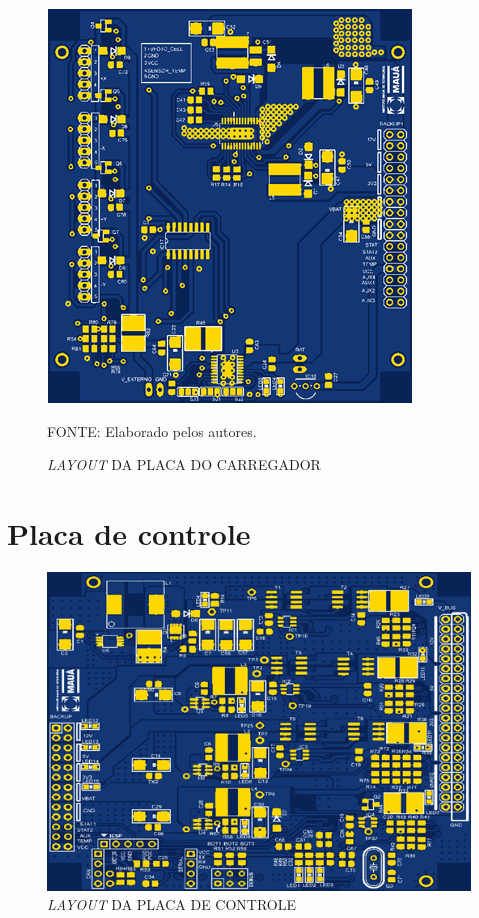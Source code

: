 \documentclass[
	12pt,				%
	openright,			%
	oneside,			%
	a4paper,			%
	english,			%
	french,				%
	spanish,			%
	brazil,				%
	oldfontcommands
	]{abntex2}
\begin{document}
\begin{apendicesenv}
	\begin{figure}[th]
		\caption{\textit{LAYOUT} DA PLACA DO CARREGADOR}
		\centering
		\includegraphics[width=0.75\linewidth]{./anexos/placa_carreg}
		
		\begin{small}
			FONTE: Elaborado pelos autores.
		\end{small}	
	\end{figure}	
	
	
\chapter[Placa de controle]{Placa de controle}\label{P_Cont}

	\begin{figure}[th]
		\caption{\textit{LAYOUT} DA PLACA DE CONTROLE}
		\centering
		\includegraphics[width=0.75\linewidth]{./anexos/placa_cont}
		

\end{figure}
\end{apendicesenv}
\end{document}
